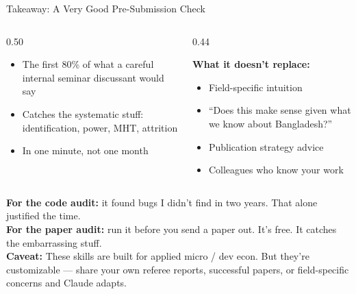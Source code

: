 \documentclass[aspectratio=169, 10pt]{beamer}
\begin{document}
\begin{frame}{Takeaway: A Very Good Pre-Submission Check}
\begin{columns}[T]
\begin{column}{0.50\textwidth}
\begin{tcolorbox}[keybox, title={\faCheck\quad What It Replaces}]
\small
\begin{itemize}\setlength{\itemsep}{3pt}
  \item The first 80\% of what a careful internal seminar discussant would say
  \item Catches the systematic stuff: identification, power, MHT, attrition
  \item In one minute, not one month
\end{itemize}
\end{tcolorbox}
\end{column}
\begin{column}{0.44\textwidth}
\begin{tcolorbox}[colback=SoftCoral!8, colframe=SoftCoral, boxrule=0.5pt, arc=3pt,
  left=6pt, right=6pt, top=4pt, bottom=4pt]
\small
\textbf{What it doesn't replace:}
\vskip3pt
\begin{itemize}\setlength{\itemsep}{2pt}
  \item Field-specific intuition
  \item ``Does this make sense given what we know about Bangladesh?''
  \item Publication strategy advice
  \item Colleagues who know your work
\end{itemize}
\end{tcolorbox}
\end{column}
\end{columns}
\vskip8pt
\begin{tcolorbox}[quotebox, width=13cm]
\small \textbf{For the code audit:} it found bugs I didn't find in two years. That alone justified the time.\\[2pt]
\textbf{For the paper audit:} run it before you send a paper out. It's free. It catches the embarrassing stuff.\\[2pt]
{\scriptsize\color{CoolGray} \textbf{Caveat:} These skills are built for applied micro / dev econ. But they're customizable --- share your own referee reports, successful papers, or field-specific concerns and Claude adapts.}
\end{tcolorbox}
\end{frame}
\end{document}
